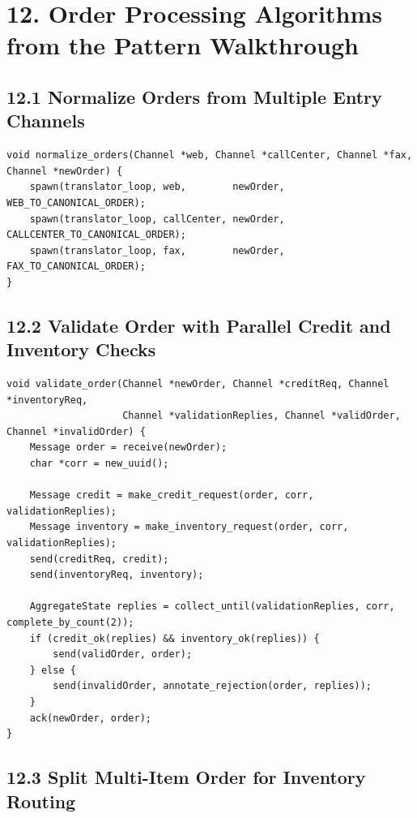 \documentclass[11pt]{article}
\begin{document}
\section{12. Order Processing Algorithms from the Pattern
Walkthrough}\label{order-processing-algorithms-from-the-pattern-walkthrough}

\subsection{12.1 Normalize Orders from Multiple Entry
Channels}\label{normalize-orders-from-multiple-entry-channels}

\begin{verbatim}
void normalize_orders(Channel *web, Channel *callCenter, Channel *fax, Channel *newOrder) {
    spawn(translator_loop, web,        newOrder, WEB_TO_CANONICAL_ORDER);
    spawn(translator_loop, callCenter, newOrder, CALLCENTER_TO_CANONICAL_ORDER);
    spawn(translator_loop, fax,        newOrder, FAX_TO_CANONICAL_ORDER);
}
\end{verbatim}

\subsection{12.2 Validate Order with Parallel Credit and Inventory
Checks}\label{validate-order-with-parallel-credit-and-inventory-checks}

\begin{verbatim}
void validate_order(Channel *newOrder, Channel *creditReq, Channel *inventoryReq,
                    Channel *validationReplies, Channel *validOrder, Channel *invalidOrder) {
    Message order = receive(newOrder);
    char *corr = new_uuid();

    Message credit = make_credit_request(order, corr, validationReplies);
    Message inventory = make_inventory_request(order, corr, validationReplies);
    send(creditReq, credit);
    send(inventoryReq, inventory);

    AggregateState replies = collect_until(validationReplies, corr, complete_by_count(2));
    if (credit_ok(replies) && inventory_ok(replies)) {
        send(validOrder, order);
    } else {
        send(invalidOrder, annotate_rejection(order, replies));
    }
    ack(newOrder, order);
}
\end{verbatim}

\subsection{12.3 Split Multi-Item Order for Inventory
Routing}\label{split-multi-item-order-for-inventory-routing}
\end{document}
